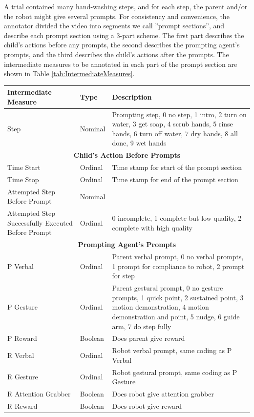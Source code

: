 \documentclass{ut-thesis}
\begin{document}
A trial contained many hand-washing steps, and for each step, the parent and/or the robot might give several prompts.  For consistency and convenience, the annotator divided the video into segments we call ''prompt sections'', and describe each prompt section using a 3-part scheme.  The first part describes the child's actions before any prompts, the second describes the prompting agent's prompts, and the third describes the child's actions after the prompts.  The intermediate measures to be annotated in each part of the prompt section are shown in Table \ref{tab:IntermediateMeasures}.

\begin{table}[h]
	\centering
	\begin{tabular}{ | p{5cm} | l | p{7cm} | }
		\hline
		\textbf{Intermediate Measure}	&	\textbf{Type}	&	\textbf{Description}	\\	\hline	\hline

		Step	&	Nominal	&	Prompting step, 0 no step, 1 intro, 2 turn on water, 3 get soap, 4 scrub hands, 5 rinse hands, 6 turn off water, 7 dry hands, 8 all done, 9 wet hands	\\	\hline \hline

		\multicolumn{3}{|c|}{\textbf{Child's Action Before Prompts}} \\	\hline

		Time Start	&	Ordinal	&	Time stamp for start of the prompt section	\\	\hline
		Time Stop	&	Ordinal	&	Time stamp for end of the prompt section	\\	\hline
		Attempted Step Before Prompt	&	Nominal	&		\\	\hline
		Attempted Step Successfully Executed Before Prompt	&	Ordinal	&	0 incomplete, 1 complete but low quality, 2 complete with high quality	\\	\hline	\hline

		\multicolumn{3}{|c|}{\textbf{Prompting Agent's Prompts}} \\	\hline

		P Verbal	&	Ordinal	&	Parent verbal prompt, 0 no verbal prompts, 1 prompt for compliance to robot, 2 prompt for step	\\	\hline
		P Gesture	&	Ordinal	&	Parent gestural prompt, 0 no gesture prompts, 1 quick point, 2 sustained point, 3 motion demonstration, 4 motion demonstration and point, 5 nudge, 6 guide arm, 7 do step fully	\\	\hline
		P Reward	&	Boolean	&	Does parent give reward	\\	\hline
		R Verbal	&	Ordinal	&	Robot verbal prompt, same coding as P Verbal	\\	\hline
		R Gesture	&	Ordinal	&	Robot gestural prompt, same coding as P Gesture	\\	\hline
		R Attention Grabber	&	Boolean	&	Does robot give attention grabber	\\	\hline
		R Reward	&	Boolean	&	Does robot give reward	\\	\hline	\hline


\end{tabular}
\end{table}
\end{document}
